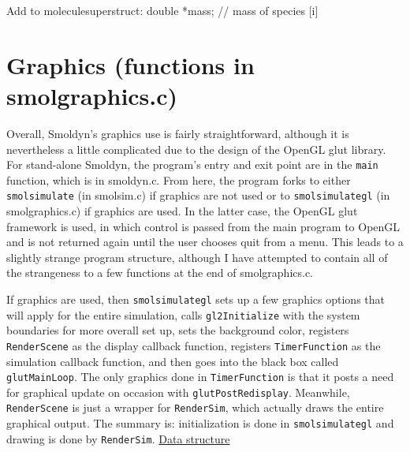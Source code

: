 \documentclass {book}
\newcommand {\ttt} {\texttt}
\begin{document}
Add to moleculesuperstruct:
	double *mass;						// mass of species [i]


\section{Graphics (functions in smolgraphics.c)}

Overall, Smoldyn's graphics use is fairly straightforward, although it is nevertheless a little complicated due to the design of the OpenGL glut library. For stand-alone Smoldyn, the program's entry and exit point are in the \ttt{main} function, which is in smoldyn.c. From here, the program forks to either \ttt{smolsimulate} (in smolsim.c) if graphics are not used or to \ttt{smolsimulategl} (in smolgraphics.c) if graphics are used. In the latter case, the OpenGL glut framework is used, in which control is passed from the main program to OpenGL and is not returned again until the user chooses quit from a menu. This leads to a slightly strange program structure, although I have attempted to contain all of the strangeness to a few functions at the end of smolgraphics.c.

If graphics are used, then \ttt{smolsimulategl} sets up a few graphics options that will apply for the entire simulation, calls \ttt{gl2Initialize} with the system boundaries for more overall set up, sets the background color, registers \ttt{RenderScene} as the display callback function, registers \ttt{TimerFunction} as the simulation callback function, and then goes into the black box called \ttt{glutMainLoop}. The only graphics done in \ttt{TimerFunction} is that it posts a need for graphical update on occasion with \ttt{glutPostRedisplay}. Meanwhile, \ttt{RenderScene} is just a wrapper for \ttt{RenderSim}, which actually draws the entire graphical output. The summary is: initialization is done in \ttt{smolsimulategl} and drawing is done by \ttt{RenderSim}.
\newline
\newline
\underline{Data structure}
\end{document}
